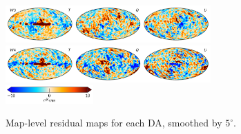 \documentclass[twocolumn]{../../common/aa}
\newcommand{\BP}{\textsc{BeyondPlanck}}
\begin{document}
\begin{figure}
	\includegraphics[width=0.7\textwidth]{figures/compsep_res_W3_IQU.pdf}\\
	\includegraphics[width=0.7\textwidth]{figures/compsep_res_W4_IQU.pdf}\\
	\includegraphics[width=0.30\textwidth]{figures/cbar_10uK.pdf}
	\caption{Map-level residual maps for each DA, smoothed by $5^\circ$.}
	\label{fig:compsep_residual}
\end{figure}



\end{document}
